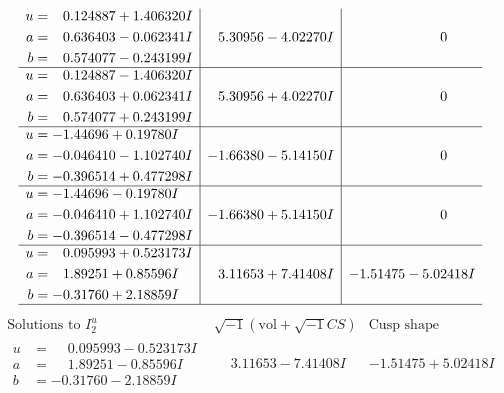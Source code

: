 \documentclass[1p]{elsarticle_modified}
\theoremstyle{definition}
\newcommand{\I}{\sqrt{-1}}
\begin{document}
$$\begin{array}{c|c|c}
\begin{aligned}
u &= \phantom{-}0.124887 + 1.406320 I \\
a &= \phantom{-}0.636403 - 0.062341 I \\
b &= \phantom{-}0.574077 - 0.243199 I\end{aligned}
 & \phantom{-}5.30956 - 4.02270 I & \phantom{-0.000000 } 0 \\ \hline\begin{aligned}
u &= \phantom{-}0.124887 - 1.406320 I \\
a &= \phantom{-}0.636403 + 0.062341 I \\
b &= \phantom{-}0.574077 + 0.243199 I\end{aligned}
 & \phantom{-}5.30956 + 4.02270 I & \phantom{-0.000000 } 0 \\ \hline\begin{aligned}
u &= -1.44696 + 0.19780 I \\
a &= -0.046410 - 1.102740 I \\
b &= -0.396514 + 0.477298 I\end{aligned}
 & -1.66380 - 5.14150 I & \phantom{-0.000000 } 0 \\ \hline\begin{aligned}
u &= -1.44696 - 0.19780 I \\
a &= -0.046410 + 1.102740 I \\
b &= -0.396514 - 0.477298 I\end{aligned}
 & -1.66380 + 5.14150 I & \phantom{-0.000000 } 0 \\ \hline\begin{aligned}
u &= \phantom{-}0.095993 + 0.523173 I \\
a &= \phantom{-}1.89251 + 0.85596 I \\
b &= -0.31760 + 2.18859 I\end{aligned}
 & \phantom{-}3.11653 + 7.41408 I & -1.51475 - 5.02418 I\\
 \hline 
 \end{array}$$\newpage$$\begin{array}{c|c|c}  
\text{Solutions to }I^u_{2}& \I (\text{vol} + \sqrt{-1}CS) & \text{Cusp shape}\\
 \hline 
\begin{aligned}
u &= \phantom{-}0.095993 - 0.523173 I \\
a &= \phantom{-}1.89251 - 0.85596 I \\
b &= -0.31760 - 2.18859 I\end{aligned}
 & \phantom{-}3.11653 - 7.41408 I & -1.51475 + 5.02418 I \\ \hline\begin{aligned}

\end{aligned}
\end{array}$$
\end{document}
